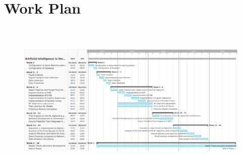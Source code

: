 

\chapter{Work Plan}

\begin{figure}[htbp]
	\centering
	\includegraphics[height=3in, angle=90]{Chapters/Figures/GanttChart.png}
\end{figure}